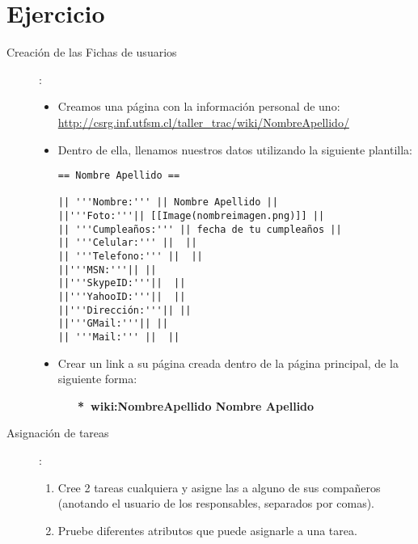 \documentclass[letter, 10pt]{article}
\begin{document}
\section{Ejercicio}
\begin{description}
  \item[Creación de las Fichas de usuarios]:
  \begin{itemize}
	\item Creamos una página con la información personal de uno:\\
    \url{http://csrg.inf.utfsm.cl/taller_trac/wiki/NombreApellido/}
	\item Dentro de ella, llenamos nuestros datos utilizando la siguiente
    plantilla:\\
\begin{verbatim}
== Nombre Apellido ==

|| '''Nombre:''' || Nombre Apellido ||
||'''Foto:'''|| [[Image(nombreimagen.png)]] ||
|| '''Cumpleaños:''' || fecha de tu cumpleaños ||
|| '''Celular:''' ||  ||
|| '''Telefono:''' ||  ||
||'''MSN:'''|| ||
||'''SkypeID:'''||  ||
||'''YahooID:'''||  ||
||'''Dirección:'''|| ||
||'''GMail:'''|| ||
|| '''Mail:''' ||  ||
\end{verbatim}
	\item Crear un link a su página creada dentro de la página principal, de
    la siguiente forma:
		\begin{center}\textbf{\ \ \ *\ \lbrack wiki:NombreApellido Nombre Apellido\rbrack}\end{center}

  \end{itemize}

  \item[Asignación de tareas]:
\begin{enumerate}
    \item Cree 2 tareas cualquiera y asigne las a alguno de sus compañeros
    (anotando el usuario de los responsables, separados por comas).
    \item Pruebe diferentes atributos que puede asignarle a una tarea.
\end{enumerate}

\end{description}
\end{document}
